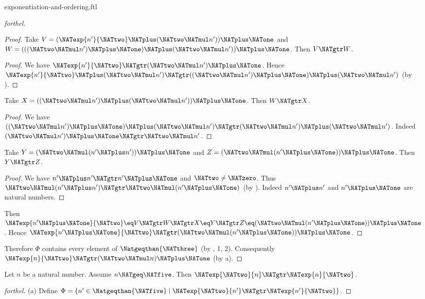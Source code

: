 \documentclass{stex}
\begin{document}
\begin{smodule}{exponentiation-and-ordering.ftl}
\begin{proof}[forthel]
\begin{proof}
    Take $V = (\NATexp{n'}{\NATtwo} \NATplus (\NATtwo \NATmul n')) \NATplus \NATone$ and $W = (((\NATtwo \NATmul n') \NATplus \NATone) \NATplus (\NATtwo \NATmul n')) \NATplus \NATone$.
    Then $V \NATgtr W$.
    \begin{proof}
      We have $\NATexp{n'}{\NATtwo} \NATgtr (\NATtwo \NATmul n') \NATplus \NATone$.
      Hence $\NATexp{n'}{\NATtwo} \NATplus (\NATtwo \NATmul n') \NATgtr ((\NATtwo \NATmul n') \NATplus \NATone) \NATplus (\NATtwo \NATmul n')$ (by ).
    \end{proof}

    Take $X = ((\NATtwo \NATmul n') \NATplus (\NATtwo \NATmul n')) \NATplus \NATone$.
    Then $W \NATgtr X$.
    \begin{proof}
      We have $((\NATtwo \NATmul n') \NATplus \NATone) \NATplus (\NATtwo \NATmul n') \NATgtr (\NATtwo \NATmul n') \NATplus (\NATtwo \NATmul n')$.
      Indeed $(\NATtwo \NATmul n') \NATplus \NATone \NATgtr \NATtwo \NATmul n'$.
    \end{proof}

    Take $Y = (\NATtwo \NATmul (n' \NATplus n')) \NATplus \NATone$ and $Z = (\NATtwo \NATmul (n' \NATplus \NATone)) \NATplus \NATone$.
    Then $Y \NATgtr Z$.
    \begin{proof}
      We have $n' \NATplus n' \NATgtr n' \NATplus \NATone$ and $\NATtwo \neq \NATzero$.
      Thus $\NATtwo \NATmul (n' \NATplus n') \NATgtr \NATtwo \NATmul (n' \NATplus \NATone)$ (by ).
      Indeed $n' \NATplus n'$ and $n' \NATplus \NATone$ are natural numbers.
    \end{proof}

    Then $\NATexp{n' \NATplus \NATone}{\NATtwo} \eq V \NATgtr W \NATgtr X \eq Y \NATgtr Z \eq (\NATtwo \NATmul (n' \NATplus \NATone)) \NATplus \NATone$.
    Hence $\NATexp{n' \NATplus \NATone}{\NATtwo} \NATgtr (\NATtwo \NATmul (n' \NATplus \NATone)) \NATplus \NATone$.
  \end{proof}

  Therefore $\Phi$ contains every element of $\Natgeqthan{\NATthree}$ (by , 1, 2).
  Consequently $\NATexp{n}{\NATtwo} \NATgtr (\NATtwo \NATmul n) \NATplus \NATone$ (by a).
\end{proof}

\begin{proposition}[forthel,id=ARITHMETIC_09_1097950367318016]
  Let $n$ be a natural number.
  Assume $n \NATgeq \NATfive$.
  Then $\NATexp{\NATtwo}{n} \NATgtr \NATexp{n}{\NATtwo}$.
\end{proposition}
\begin{proof}[forthel]
  (a) Define $\Phi = \{ n' \in \Natgeqthan{\NATfive} \mid \NATexp{\NATtwo}{n'} \NATgtr \NATexp{n'}{\NATtwo} \}$.


\end{proof}
\end{smodule}
\end{document}
